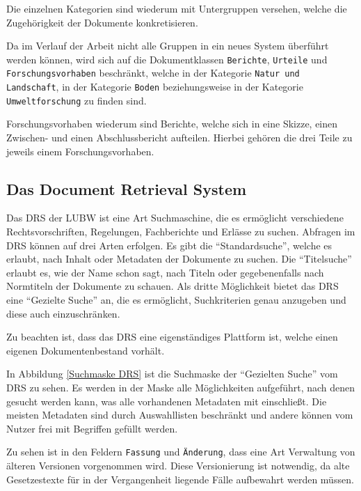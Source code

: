 Die einzelnen Kategorien sind wiederum mit Untergruppen versehen, welche die Zugeh\"origkeit der Dokumente konkretisieren.

Da im Verlauf der Arbeit nicht alle Gruppen in ein neues System \"uberf\"uhrt werden k\"onnen, wird sich auf die Dokumentklassen \texttt{Berichte}, \texttt{Urteile} und \texttt{Forschungsvorhaben} beschr\"ankt, welche in der Kategorie \texttt{Natur und Landschaft}, in der Kategorie \texttt{Boden} beziehungsweise in der Kategorie \texttt{Umweltforschung} zu finden sind.

Forschungsvorhaben wiederum sind Berichte, welche sich in eine Skizze, einen Zwischen- und einen Abschlussbericht aufteilen. Hierbei geh\"oren die drei Teile zu jeweils einem Forschungsvorhaben. \cite{LUBW_FADO}

\subsection{Das Document Retrieval System} \label{DRS}
Das \ac{DRS} der \ac{LUBW} ist eine Art Suchmaschine, die es erm\"oglicht verschiedene Rechtsvorschriften, Regelungen, Fachberichte und Erl\"asse zu suchen. Abfragen im \ac{DRS} k\"onnen auf drei Arten erfolgen. Es gibt die "`Standardsuche"', welche es erlaubt, nach Inhalt oder Metadaten der Dokumente zu suchen. Die "`Titelsuche"' erlaubt es, wie der Name schon sagt, nach Titeln oder gegebenenfalls nach Normtiteln der Dokumente zu schauen. Als dritte M\"oglichkeit bietet das \ac{DRS} eine "`Gezielte Suche"' an, die es erm\"oglicht, Suchkriterien genau anzugeben und diese auch einzuschr\"anken.
\cite{DRS}

Zu beachten ist, dass das \ac{DRS} eine eigenst\"andiges Plattform ist, welche einen eigenen Dokumentenbestand vorh\"alt.

In Abbildung \ref{Suchmaske DRS} ist die Suchmaske der "`Gezielten Suche"' vom \ac{DRS} zu sehen. Es werden in der Maske alle M\"oglichkeiten aufgef\"uhrt, nach denen gesucht werden kann, was alle vorhandenen Metadaten mit einschlie\ss{}t. Die meisten Metadaten sind durch Auswahllisten beschr\"ankt und andere k\"onnen vom Nutzer frei mit Begriffen gef\"ullt werden.

Zu sehen ist in den Feldern \texttt{Fassung} und \texttt{\"Anderung}, dass eine Art Verwaltung von \"alteren Versionen vorgenommen wird. Diese Versionierung ist notwendig, da alte Gesetzestexte f\"ur in der Vergangenheit liegende F\"alle aufbewahrt werden m\"ussen.

